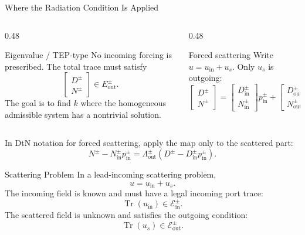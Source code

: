 \documentclass[aspectratio=169]{beamer}
\begin{document}
\begin{frame}{Where the Radiation Condition Is Applied}
  \small
  \begin{columns}[T,onlytextwidth]
    \begin{column}{0.48\textwidth}
      \begin{block}{Eigenvalue / TEP-type}
        No incoming forcing is prescribed. The total trace must satisfy
        \[
          \begin{bmatrix}D^\pm\\N^\pm\end{bmatrix}
          \in E_{\mathrm{out}}^\pm.
        \]
        The goal is to find \(k\) where the homogeneous admissible system has
        a nontrivial solution.
      \end{block}
    \end{column}
    \begin{column}{0.48\textwidth}
      \begin{block}{Forced scattering}
        Write \(u=u_{\mathrm{in}}+u_s\). Only \(u_s\) is outgoing:
        \[
          \begin{bmatrix}D^\pm\\N^\pm\end{bmatrix}
          =
          \begin{bmatrix}D_{\mathrm{in}}^\pm\\N_{\mathrm{in}}^\pm\end{bmatrix}
          p_{\mathrm{in}}^\pm
          +
          \begin{bmatrix}D_{\mathrm{out}}^\pm\\N_{\mathrm{out}}^\pm\end{bmatrix}
          r^\pm.
        \]
      \end{block}
    \end{column}
  \end{columns}
  In DtN notation for forced scattering, apply the map only to the scattered part:
  \[
    N^\pm-N_{\mathrm{in}}^\pm p_{\mathrm{in}}^\pm
    =
    \Lambda_{\mathrm{out}}^\pm
    \left(D^\pm-D_{\mathrm{in}}^\pm p_{\mathrm{in}}^\pm\right).
  \]
\end{frame}

\begin{frame}{Scattering Problem}
  In a lead-incoming scattering problem,
  \[
    u=u_{\mathrm{in}}+u_s.
  \]
  The incoming field is known and must have a legal incoming port trace:
  \[
    \operatorname{Tr}(u_{\mathrm{in}})
    \in
    \mathcal E_{\mathrm{in}}^\pm.
  \]
  The scattered field is unknown and satisfies the outgoing condition:
  \[
    \operatorname{Tr}(u_s)
    \in
    \mathcal E_{\mathrm{out}}^\pm.
  \]
\end{frame}
\end{document}
